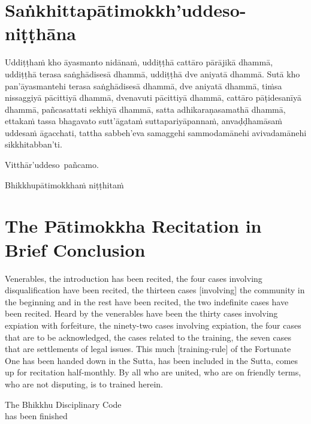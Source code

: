 
\section{Saṅkhittapātimokkh'uddeso-niṭṭhāna}
\label{sankhittapatimokkh'uddeso-nitthana}

\ifafiveversion\vspace{0.15cm}\fi
\ifninebythirteenversion\vspace{0.15cm}\fi

Uddiṭṭhaṁ kho āyasmanto nidānaṁ, uddiṭṭhā cattāro pārājikā dhammā, uddiṭṭhā terasa saṅghādisesā dhammā, uddiṭṭhā dve aniyatā dhammā. Sutā kho pan'āyasmantehi terasa saṅghādisesā dhammā, dve aniyatā dhammā, tiṁsa nissaggiyā pācittiyā dhammā, dvenavuti pācittiyā dhammā, cattāro pāṭidesanīyā dhammā, pañcasattati sekhiyā dhammā, satta adhikaraṇasamathā dhammā, ettakaṁ tassa bhagavato sutt'āgataṁ suttapariyāpannaṁ, anvaḍḍhamāsaṁ uddesaṁ āgacchati, tattha sabbeh'eva samaggehi sammodamānehi avivadamānehi sikkhitabban'ti.

Vitthār'uddeso pañcamo.

\begin{outro}
	Bhikkhupātimokkhaṁ niṭṭhitaṁ
\end{outro}

\clearpage



\section{The Pātimokkha Recitation in Brief Conclusion}
\label{patimokkha-in-brief-conclusion}

\ifafiveversion\vspace{0.15cm}\fi
\ifninebythirteenversion\vspace{0.15cm}\fi

Venerables, the introduction has been recited, the four cases involving disqualification have been recited, the thirteen cases [involving] the community in the beginning and in the rest have been recited, the two indefinite cases have been recited. Heard by the venerables have been the thirty cases involving expiation with forfeiture, the ninety-two cases involving expiation, the four cases that are to be acknowledged, the cases related to the training, the seven cases that are settlements of legal issues. This much [training-rule] of the Fortunate One has been handed down in the Sutta, has been included in the Sutta, comes up for recitation half-monthly. By all who are united, who are on friendly terms, who are not disputing, is to trained herein.

\begin{outro}
	The Bhikkhu Disciplinary Code \ifninebythirteenversion\\\fi has been finished
\end{outro}

\clearpage

